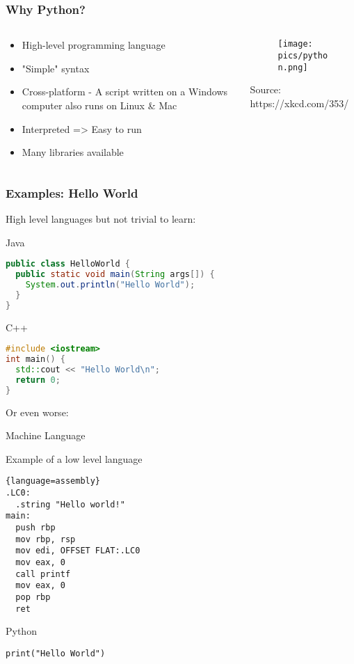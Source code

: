 \documentclass[10pt, a4paper]{beamer} %
\begin{document}
\begin{frame}[c]\frametitle{Why Python?}
	\begin{columns}
		\begin{column}{0.5\textwidth}
			\begin{itemize}
				\item High-level programming language
				\item "Simple" syntax
				\item Cross-platform - A script written on a Windows computer also runs on Linux \& Mac
				\item Interpreted => Easy to run
				\item Many libraries available
			\end{itemize}
		\end{column}
		\begin{column}{0.5\textwidth}  %
			\begin{figure}
				\texttt{[image: pics/python.png]}
			\end{figure}
			\tiny Source: https://xkcd.com/353/
		\end{column}
	\end{columns}

\end{frame}

\begin{frame}\frametitle{Examples: Hello World}
	High level languages but not trivial to learn:
	\begin{block}{Java}
		{
			\begin{lstlisting}[language=Java]
public class HelloWorld {
  public static void main(String args[]) {
    System.out.println("Hello World");
  }
}
  \end{lstlisting}
		}
	\end{block}

	\begin{block}{C++}
		{
			\begin{lstlisting}[language=C++, morekeywords=include]
#include <iostream>
int main() {
  std::cout << "Hello World\n";
  return 0;
}
  \end{lstlisting}
		}
	\end{block}
	\framebreak
	Or even worse:
	\begin{block}{Machine Language}

		Example of a low level language
		\begin{lstlisting}{language=assembly}
.LC0:
  .string "Hello world!"
main:
  push rbp
  mov rbp, rsp
  mov edi, OFFSET FLAT:.LC0
  mov eax, 0
  call printf
  mov eax, 0
  pop rbp
  ret
\end{lstlisting}

	\end{block}

	\begin{block}{Python}
		\begin{lstlisting}
print("Hello World")
    \end{lstlisting}
	\end{block}

\end{frame}
\end{document}
